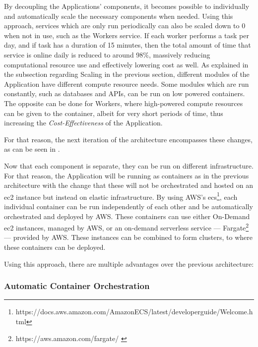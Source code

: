 By decoupling the Applications' components, it becomes possible to individually and automatically scale the necessary components when needed. Using this approach, services which are only run periodically can also be scaled down to 0 when not in use, such as the Workers service. If each worker performs a task per day, and if task has a duration of 15 minutes, then the total amount of time that service is online daily is reduced to around 98\%, massively reducing computational resource use and effectively lowering cost as well. As explained in the subsection regarding Scaling in the previous section, different modules of the Application have different compute resource needs. Some modules which are run constantly, such as databases and APIs, can be run on low powered containers. The opposite can be done for Workers, where high-powered compute resources can be given to the container, albeit for very short periods of time, thus increasing the \textit{Cost-Effectiveness} of the Application.


 


For that reason, the next iteration of the architecture encompasses these changes, as can be seen in .

Now that each component is separate, they can be run on different infrastructure. For that reason, the Application will be running as containers as in the previous architecture with the change that these will not be orchestrated and hosted on an \gls{ec2} instance but instead on elastic infrastructure. By using AWS's \gls{ecs}\footnote{https://docs.aws.amazon.com/AmazonECS/latest/developerguide/Welcome.html\label{foot:aws-ecs}}, each individual container can be run independently of each other and be automatically orchestrated and deployed by AWS. These containers can use either On-Demand {ec2} instances, managed by AWS, or an on-demand serverless service --- Fargate\footnote{https://aws.amazon.com/fargate/ \label{foot:fargate}} --- provided by AWS. These instances can be combined to form clusters, to where these containers can be deployed. 

Using this approach, there are multiple advantages over the previous architecture:

\subsubsection{Automatic Container Orchestration}\label{methodology:sss:automatic-container-orchestration}

